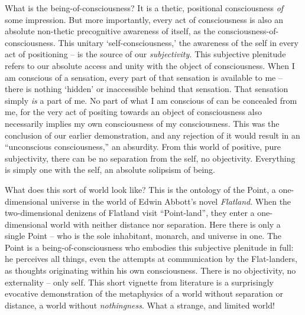 

What is the being-of-consciousness? It is a thetic, positional consciousness \emph{of} some impression. But more importantly, every act of consciousness is also an absolute non-thetic precognitive awareness of itself, as the consciousness-of-consciousness. This unitary \enquote*{self-consciousness,} the awareness of the self in every act of positioning -- is the source of our \emph{subjectivity.}  This subjective plenitude refers to our absolute access and unity with the object of consciousness. When I am conscious of a sensation, every part of that sensation is available to me -- there is nothing \enquote*{hidden} or inaccessible behind that sensation. 
That sensation simply \emph{is} a part of me. No part of what I am conscious of can be concealed from me, for the very act of positing towards an object of consciousness also necessarily implies my own consciousness of my consciousness. This was the conclusion of our earlier demonstration, and any rejection of it would result in an \enquote{unconscious consciousness,} an absurdity. From this world of positive, pure subjectivity, there can be no separation from the self, no objectivity. Everything is simply one with the self, an absolute solipsism of being.

What does this sort of world look like? This is the ontology of the Point, a one-dimensional universe in the world of Edwin Abbott's novel \emph{Flatland}. When the two-dimensional denizens of Flatland visit \enquote{Point-land}, they enter a one-dimensional world with neither distance nor separation. Here there is only a single Point -- who is the sole inhabitant, monarch, and universe in one. The Point is a being-of-consciousness who embodies this subjective plenitude in full: he perceives all things, even the attempts at communication by the Flat-landers, as thoughts originating within his own consciousness. There is no objectivity, no externality -- only self. This short vignette from literature is a surprisingly evocative demonstration of the metaphysics of a world without separation or distance, a world without \emph{nothingness}. What a strange, and limited world!

